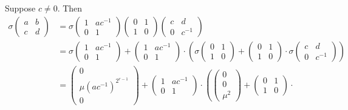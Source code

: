 Suppose $c\neq0$. Then
\begin{align}
\sigma\left(\begin{matrix} a & b \\ c & d \end{matrix}\right) 
&=
\sigma
	\left(\begin{matrix} 1 & ac^{-1} \\ 0 & 1 \end{matrix}\right)
	\left(\begin{matrix} 0 & 1 \\ 1 & 0 \end{matrix}\right)
	\left(\begin{matrix} c & d \\ 0 & c^{-1} \end{matrix}\right)
 \nonumber\\
&=
\sigma
	\left(\begin{matrix} 1 & ac^{-1} \\ 0 & 1 \end{matrix}\right)
 +
\left(\begin{matrix} 1 & ac^{-1} \\ 0 & 1 \end{matrix}\right) \cdot
\left(
	\sigma
		\left(\begin{matrix} 0 & 1 \\ 1 & 0 \end{matrix}\right)
	 +
	\left(\begin{matrix} 0 & 1 \\ 1 & 0 \end{matrix}\right) \cdot
	\sigma
		\left(\begin{matrix} c & d \\ 0 & c^{-1} \end{matrix}\right)
\right)\nonumber \\
&=
\left(\begin{matrix} 0 \\ \mu(ac^{-1})^{2^{r-1}} \\ 0 \end{matrix}\right)
+
\left(\begin{matrix} 1 & ac^{-1} \\ 0 & 1 \end{matrix}\right) \cdot
\left(
	\left(\begin{matrix} 0 \\ 0 \\ \mu^2 \end{matrix}\right)
	+
	\left(\begin{matrix} 0 & 1 \\ 1 & 0 \end{matrix}\right) \cdot

\end{align}
